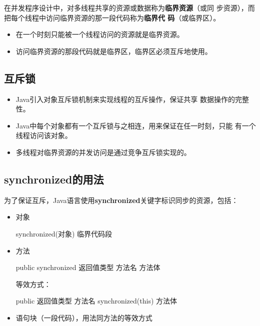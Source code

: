 在并发程序设计中，对多线程共享的资源或数据称为{\bf\Red 临界资源}（或同
步资源），而把每个线程中访问临界资源的那一段代码称为{\bf\Blue 临界代
  码}（或临界区）。

\begin{itemize}
\item 在一个时刻只能被一个线程访问的资源就是临界资源。
\item 访问临界资源的那段代码就是临界区，{\kai\Red 临界区必须互斥地使用}。
\end{itemize}

\subsection{互斥锁}

\begin{itemize}
\item Java引入对象{\Red\hei 互斥锁}机制来实现线程的互斥操作，保证共享
  数据操作的完整性。
\item Java中每个对象都有一个互斥锁与之相连，用来保证在任一时刻，只能
  有一个线程访问该对象。
\item 多线程对临界资源的并发访问是通过竞争互斥锁实现的。
\end{itemize}

\subsection{synchronized的用法}

为了保证互斥，Java语言使用{\bf\Red synchronized}关键字标识同步的{\hei\Blue 资源}，包括：

\begin{itemize}
\item 对象
  \begin{javaCode}
    synchronized(对象) {
      临界代码段
    }
  \end{javaCode}
\item 方法
  \begin{javaCode}
    public synchronized 返回值类型 方法名 {
      方法体
    }
  \end{javaCode}

  等效方式：
  
  \begin{javaCode}
    public 返回值类型 方法名 {
      synchronized(this) {
        方法体
      }
    }
  \end{javaCode}
\item 语句块（一段代码），用法同方法的等效方式
\end{itemize}

